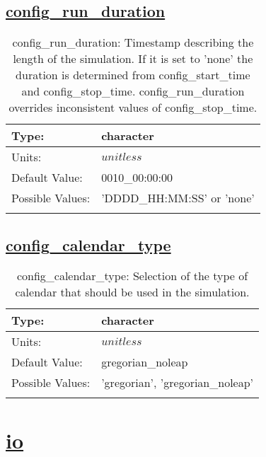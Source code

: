 \subsection[config\_run\_duration]{\hyperref[sec:nm_tab_time_management]{config\_run\_duration}}
\label{subsec:nm_sec_config_run_duration}
\begin{center}
\begin{longtable}{| p{2.0in} || p{4.0in} |}
    \hline
    Type: & character \\
    \hline
    Units: & $unitless$ \\
    \hline
    Default Value: & 0010\_00:00:00 \\
    \hline
    Possible Values: & 'DDDD\_HH:MM:SS' or 'none' \\
    \hline
    \caption{config\_run\_duration: Timestamp describing the length of the simulation. If it is set to 'none' the duration is determined from config\_start\_time and config\_stop\_time. config\_run\_duration overrides inconsistent values of config\_stop\_time.}
\end{longtable}
\end{center}
\subsection[config\_calendar\_type]{\hyperref[sec:nm_tab_time_management]{config\_calendar\_type}}
\label{subsec:nm_sec_config_calendar_type}
\begin{center}
\begin{longtable}{| p{2.0in} || p{4.0in} |}
    \hline
    Type: & character \\
    \hline
    Units: & $unitless$ \\
    \hline
    Default Value: & gregorian\_noleap \\
    \hline
    Possible Values: & 'gregorian', 'gregorian\_noleap' \\
    \hline
    \caption{config\_calendar\_type: Selection of the type of calendar that should be used in the simulation.}
\end{longtable}
\end{center}
\section[io]{\hyperref[sec:nm_tab_io]{io}}
\label{sec:nm_sec_io}
